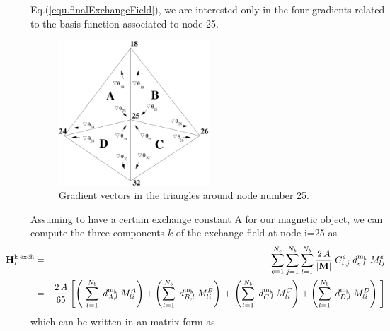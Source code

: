 \documentclass[11pt]{article}
\newcommand{\rv}[1]{\ensuremath{\mathbf{#1}}} %
\begin{document}
Eq.(\ref{equ.finalExchangeField}), we are interested only in the
four gradients related to the basis function associated to node 25. 
\begin{figure}[htb] 
  \begin{center}
    \includegraphics[clip=true, width=0.5\textwidth]{gradients} 
  \end{center}
  \caption[]{Gradient vectors in the triangles around node number 25.} 
  \label{fig.gradientsAround25} 
\end{figure}
Assuming to have a certain exchange constant A for our magnetic
object, we can compute the three components $k$ of the exchange field at
node i=25 as
\begin{eqnarray}
\hspace{-1cm}
\rv{H}_i^\mathrm{k \; exch} 
& = &  
\sum_{e=1}^{N_e} 
\sum_{j=1}^{N_b} 
\sum_{l=1}^{N_b} 
\frac{2 \, A}{|\rv{M}|} \; C_{i,j}^e 
\; d^\mathrm{m_k}_{e,l} \;  
M^e_{lj} 
\nonumber
\\& = &  
\frac{2 \, A}{65} 
\left[
\left(\ 
\sum_{l=1}^{N_b} \; 
d^\mathrm{m_k}_{A,l} \;  
M^A_{li} 
\right)
+  
\left(
\sum_{l=1}^{N_b} \; 
d^\mathrm{m_k}_{B,l} \;  
M^B_{li} 
\right)
\right. 
+ 
\left. 
\left( 
\sum_{l=1}^{N_b} \; 
d^\mathrm{m_k}_{C,l} \;  
M^C_{li} 
\right)
+  
\left(
\sum_{l=1}^{N_b} \; 
d^\mathrm{m_k}_{D,l} \;  
M^D_{li} 
\right)
\; \right]  
\label{equ.fieldDerivation_a}
\end{eqnarray}
which can be written in an matrix form as 
\end{document}
